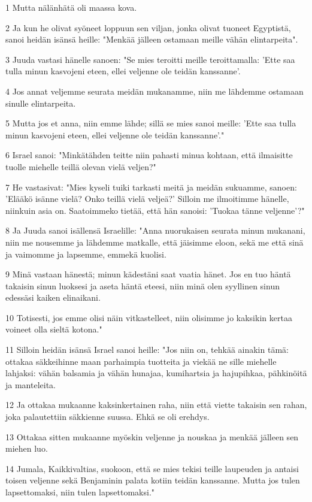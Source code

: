 \par 1 Mutta nälänhätä oli maassa kova.
\par 2 Ja kun he olivat syöneet loppuun sen viljan, jonka olivat tuoneet Egyptistä, sanoi heidän isänsä heille: "Menkää jälleen ostamaan meille vähän elintarpeita".
\par 3 Juuda vastasi hänelle sanoen: "Se mies teroitti meille teroittamalla: 'Ette saa tulla minun kasvojeni eteen, ellei veljenne ole teidän kanssanne'.
\par 4 Jos annat veljemme seurata meidän mukanamme, niin me lähdemme ostamaan sinulle elintarpeita.
\par 5 Mutta jos et anna, niin emme lähde; sillä se mies sanoi meille: 'Ette saa tulla minun kasvojeni eteen, ellei veljenne ole teidän kanssanne'."
\par 6 Israel sanoi: "Minkätähden teitte niin pahasti minua kohtaan, että ilmaisitte tuolle miehelle teillä olevan vielä veljen?"
\par 7 He vastasivat: "Mies kyseli tuiki tarkasti meitä ja meidän sukuamme, sanoen: 'Elääkö isänne vielä? Onko teillä vielä veljeä?' Silloin me ilmoitimme hänelle, niinkuin asia on. Saatoimmeko tietää, että hän sanoisi: 'Tuokaa tänne veljenne'?"
\par 8 Ja Juuda sanoi isällensä Israelille: "Anna nuorukaisen seurata minun mukanani, niin me nousemme ja lähdemme matkalle, että jäisimme eloon, sekä me että sinä ja vaimomme ja lapsemme, emmekä kuolisi.
\par 9 Minä vastaan hänestä; minun kädestäni saat vaatia hänet. Jos en tuo häntä takaisin sinun luoksesi ja aseta häntä eteesi, niin minä olen syyllinen sinun edessäsi kaiken elinaikani.
\par 10 Totisesti, jos emme olisi näin vitkastelleet, niin olisimme jo kaksikin kertaa voineet olla sieltä kotona."
\par 11 Silloin heidän isänsä Israel sanoi heille: "Jos niin on, tehkää ainakin tämä: ottakaa säkkeihinne maan parhaimpia tuotteita ja viekää ne sille miehelle lahjaksi: vähän balsamia ja vähän hunajaa, kumihartsia ja hajupihkaa, pähkinöitä ja manteleita.
\par 12 Ja ottakaa mukaanne kaksinkertainen raha, niin että viette takaisin sen rahan, joka palautettiin säkkienne suussa. Ehkä se oli erehdys.
\par 13 Ottakaa sitten mukaanne myöskin veljenne ja nouskaa ja menkää jälleen sen miehen luo.
\par 14 Jumala, Kaikkivaltias, suokoon, että se mies tekisi teille laupeuden ja antaisi toisen veljenne sekä Benjaminin palata kotiin teidän kanssanne. Mutta jos tulen lapsettomaksi, niin tulen lapsettomaksi."
